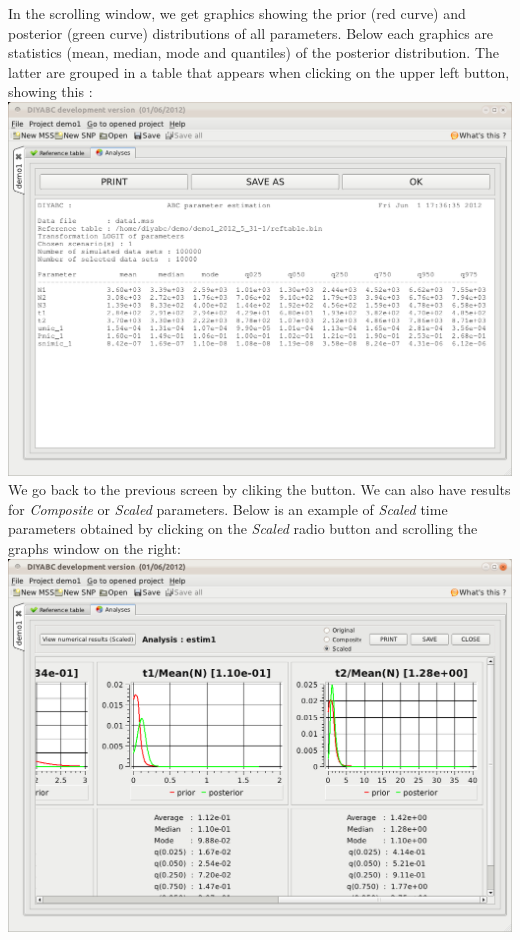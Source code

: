 In the scrolling window, we get graphics showing the prior (red curve) and posterior (green curve) distributions of all parameters. Below each graphics are statistics (mean, median, mode and quantiles) of the posterior distribution. The latter are grouped in a table that appears when clicking on the upper left  button, showing this :\\

\includegraphics[scale=0.35]{gui_pictures/Capture-DIYABC-41.png} \\

We go back to the previous screen by cliking the  button.
\newpage
 We can also have results for \emph{Composite} or \emph{Scaled} parameters. Below is an example of \emph{Scaled} time parameters obtained by clicking on the \emph{Scaled} radio button and scrolling the graphs window on the right:\\
 
\includegraphics[scale=0.35]{gui_pictures/Capture-DIYABC-42.png} \\
